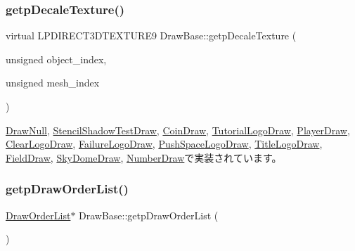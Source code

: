 \subsubsection{\texorpdfstring{getp\+Decale\+Texture()}{getpDecaleTexture()}}
{\footnotesize\ttfamily virtual L\+P\+D\+I\+R\+E\+C\+T3\+D\+T\+E\+X\+T\+U\+R\+E9 Draw\+Base\+::getp\+Decale\+Texture (\begin{DoxyParamCaption}\item[{unsigned}]{object\+\_\+index,  }\item[{unsigned}]{mesh\+\_\+index }\end{DoxyParamCaption})\hspace{0.3cm}{\ttfamily [pure virtual]}}



\mbox{\hyperlink{class_draw_null_a2dfa2d2cbb66249f933420a38e9cadad}{Draw\+Null}}, \mbox{\hyperlink{class_stencil_shadow_test_draw_a58f3699fa7ced20625edca807698aa85}{Stencil\+Shadow\+Test\+Draw}}, \mbox{\hyperlink{class_coin_draw_af99db1c0db2ed6b3ba429f23cd44279b}{Coin\+Draw}}, \mbox{\hyperlink{class_tutorial_logo_draw_abf06755b745dc62341a817a58d377659}{Tutorial\+Logo\+Draw}}, \mbox{\hyperlink{class_player_draw_ae69b46285241f390fbf62f6af2b5340d}{Player\+Draw}}, \mbox{\hyperlink{class_clear_logo_draw_ae67f9779fb2f9aa05d55c2167a36ddb0}{Clear\+Logo\+Draw}}, \mbox{\hyperlink{class_failure_logo_draw_a29a9642997edb92eeec83e8bd6b1ddee}{Failure\+Logo\+Draw}}, \mbox{\hyperlink{class_push_space_logo_draw_abfba58752543d8b2ccfe1e4003032dd3}{Push\+Space\+Logo\+Draw}}, \mbox{\hyperlink{class_title_logo_draw_a15ca49711182673a20439200dd8bc119}{Title\+Logo\+Draw}}, \mbox{\hyperlink{class_field_draw_a77cef7390fbe8fc68c0b325f4fcc839f}{Field\+Draw}}, \mbox{\hyperlink{class_sky_dome_draw_a99ec8e0a5aea708b66cf07c79a6449d1}{Sky\+Dome\+Draw}}, \mbox{\hyperlink{class_number_draw_a77d155c00ac4637154e62904556de05a}{Number\+Draw}}で実装されています。

\mbox{\label{class_draw_base_a280d750f48f6b8d148cbfe2988834268}} 
\subsubsection{\texorpdfstring{getp\+Draw\+Order\+List()}{getpDrawOrderList()}}
{\footnotesize\ttfamily \mbox{\hyperlink{class_draw_order_list}{Draw\+Order\+List}}$\ast$ Draw\+Base\+::getp\+Draw\+Order\+List (\begin{DoxyParamCaption}{ }\end{DoxyParamCaption})\hspace{0.3cm}{\ttfamily [inline]}}



